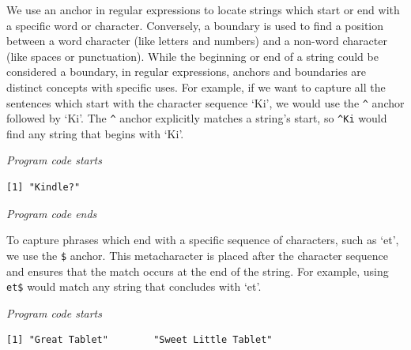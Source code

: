 We use an anchor in regular expressions to locate strings which start or
end with a specific word or character. Conversely, a boundary is used to
find a position between a word character (like letters and numbers) and
a non-word character (like spaces or punctuation). While the beginning
or end of a string could be considered a boundary, in regular
expressions, anchors and boundaries are distinct concepts with specific
uses. For example, if we want to capture all the sentences which start with
the character sequence `Ki', we would use the \texttt{\^{}} anchor
followed by `Ki'. The \texttt{\^{}} anchor explicitly matches a string's
start, so \texttt{\^{}Ki} would find any string that begins with `Ki'.

\emph{Program code starts}

\begin{Shaded}
\begin{Highlighting}[]
\NormalTok{(} \NormalTok{)}
\end{Highlighting}
\end{Shaded}

\begin{verbatim}
[1] "Kindle?"
\end{verbatim}

\emph{Program code ends}

To capture phrases which end with a specific sequence of characters, such as
`et', we use the \texttt{\$} anchor. This metacharacter is placed after
the character sequence and ensures that the match occurs at the end of
the string. For example, using \texttt{et\$} would match any string that
concludes with `et'.

\emph{Program code starts}

\begin{Shaded}
\begin{Highlighting}[]
\NormalTok{(} \NormalTok{)}
\end{Highlighting}
\end{Shaded}

\begin{verbatim}
[1] "Great Tablet"        "Sweet Little Tablet"
\end{verbatim}


